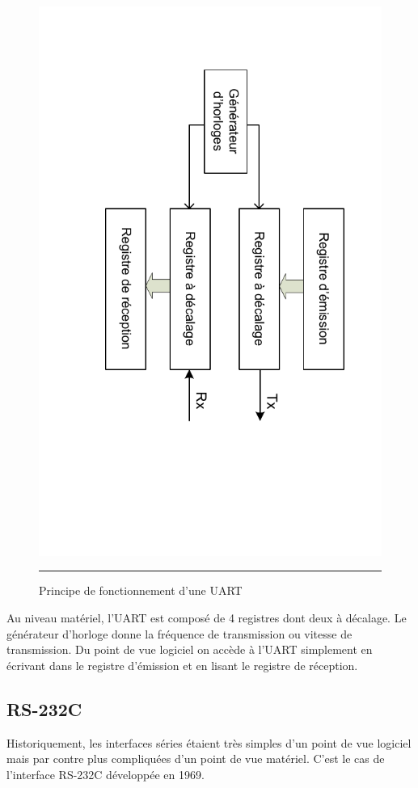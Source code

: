 \begin{figure}[htb]
  \centering
  \includegraphics[angle=90, trim = 15mm 0mm 5mm 0mm, clip, width=13cm]{./Figures/serial/UART.pdf}
  \rule{35em}{0.5pt}
  \caption[uart]{Principe de fonctionnement d'une UART}
  \label{fig:uart}
\end{figure}

Au niveau matériel, l'UART est composé de 4 registres dont deux à décalage. Le générateur d'horloge donne la fréquence de transmission ou vitesse de transmission. Du point de vue logiciel on accède à l'UART simplement en écrivant dans le registre d'émission et en lisant le registre de réception.

\subsection{RS-232C}
Historiquement, les interfaces séries étaient très simples d'un point de vue logiciel mais par contre plus compliquées d'un point de vue matériel. C'est le cas de l'interface RS-232C développée en 1969.

